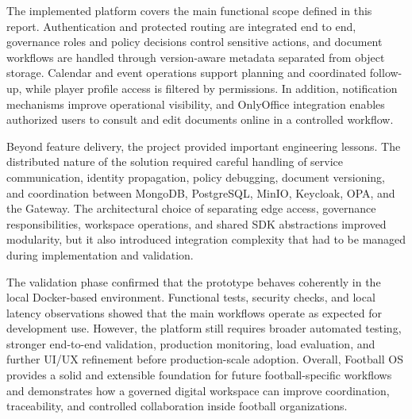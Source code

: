 The implemented platform covers the main functional scope defined in this
report. Authentication and protected routing are integrated end to end,
governance roles and policy decisions control sensitive actions, and document
workflows are handled through version-aware metadata separated from object
storage. Calendar and event operations support planning and coordinated
follow-up, while player profile access is filtered by permissions. In addition,
notification mechanisms improve operational visibility, and OnlyOffice
integration enables authorized users to consult and edit documents online in a
controlled workflow.
\vspace{0.15cm}

Beyond feature delivery, the project provided important engineering lessons.
The distributed nature of the solution required careful handling of service
communication, identity propagation, policy debugging, document versioning, and
coordination between MongoDB, PostgreSQL, MinIO, Keycloak, OPA, and the
Gateway. The architectural choice of separating edge access, governance
responsibilities, workspace operations, and shared SDK abstractions improved
modularity, but it also introduced integration complexity that had to be
managed during implementation and validation.
\vspace{0.15cm}

The validation phase confirmed that the prototype behaves coherently in the
local Docker-based environment. Functional tests, security checks, and local
latency observations showed that the main workflows operate as expected for
development use. However, the platform still requires broader automated
testing, stronger end-to-end validation, production monitoring, load
evaluation, and further UI/UX refinement before production-scale adoption.
Overall, Football OS provides a solid and extensible foundation for future
football-specific workflows and demonstrates how a governed digital workspace
can improve coordination, traceability, and controlled collaboration inside
football organizations.
